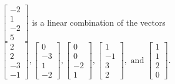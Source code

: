 \begin{exercise}
\begin{exerciseStatement}
  \end{exerciseStatement}
  \begin{exerciseAnswer}
   \(\left[\begin{array}{c}
-2 \\
1 \\
-2 \\
5
\end{array}\right]\) 
  	 is  
	a linear combination of the vectors \(\left[\begin{array}{c}
2 \\
2 \\
-3 \\
-1
\end{array}\right] , \left[\begin{array}{c}
0 \\
-3 \\
1 \\
-2
\end{array}\right] , \left[\begin{array}{c}
0 \\
0 \\
-2 \\
1
\end{array}\right] , \left[\begin{array}{c}
1 \\
-1 \\
3 \\
2
\end{array}\right] , \text{ and } \left[\begin{array}{c}
1 \\
1 \\
2 \\
0
\end{array}\right]\).

	
  


  \end{exerciseAnswer}
\end{exercise}